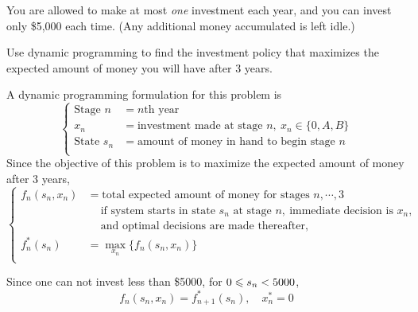 \documentclass[a4paper]{article}
\begin{document}
\begin{enumerate}
\hspace*{4ex}You are allowed to make at most \textit{one} investment each year, and you can invest only \$5,000 each time. (Any additional money accumulated is left idle.)

\hspace*{4ex}Use dynamic programming to find the investment policy that maximizes the expected amount of money you will have after 3 years.

\begin{solution}
	
	A dynamic programming formulation for this problem is
	\begin{equation*}\left\{
		\begin{aligned}
			\text{Stage } n&=n\text{th year}\\
			x_n&=\text{investment made at stage }n,\ x_n\in\{0,A,B\}\\
			\text{State } s_n&=\text{amount of money in hand to begin stage }n\\
		\end{aligned}\right.
	\end{equation*}
	Since the objective of this problem is to maximize the expected amount of money after 3 years,
	\begin{equation*}\left\{
		\begin{aligned}
			f_n(s_n,x_n)&=\text{total expected amount of money for stages }n,\cdots,3\ \\
			 &\quad\ \text{if system starts in state }s_n \text{ at stage }n,\ \text{immediate decision is }x_n,\ \\
			 &\quad\ \text{and optimal decisions are made }\text{thereafter,}\\
			f_n^*(s_n)&=\max\limits_{x_n}\{f_n(s_n,x_n)\}\\
		\end{aligned}\right.
	\end{equation*}
	
	Since one can not invest less than \$5000, for $0\leqslant s_n< 5000$, $$f_n(s_n,x_n)=f_{n+1}^*(s_n), \quad x_n^*=0$$
	

\end{solution}
\end{enumerate}
\end{document}
